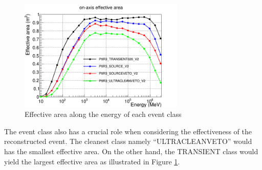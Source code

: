 \newpage

\begin{figure}[h!]
    \centering
    \includegraphics[width=0.7\textwidth]{content/background/figures/eff_event_class.png}
    \caption{Effective area along the energy of each event class \citep{lat_p8_performance}}
    \label{fig:eff_event_class}
\end{figure}


The event class also has a crucial role when considering the effectiveness of the reconstructed event.
The cleanest class namely ``ULTRACLEANVETO'' would has the smallest
effective area. On the other hand, the TRANSIENT class would yield 
the largest effective area as illustrated in Figure \ref{fig:eff_event_class}.
